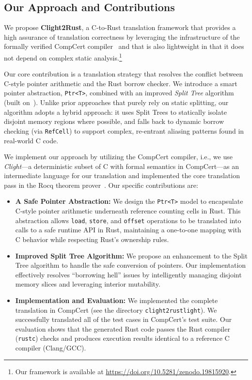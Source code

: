 \documentclass{llncs} %
\begin{document}
\subsection{Our Approach and Contributions}
%
We propose \textbf{Clight2Rust}, a C-to-Rust translation framework that provides
a high assurance of translation correctness by leveraging the infrastructure of the formally verified CompCert compiler~\cite{Leroy2009} and that is also lightweight in that it does not depend on complex static analysis.\footnote{Our framework is available at {\small\url{https://doi.org/10.5281/zenodo.19815920}}.}

Our core contribution is a translation strategy that resolves the conflict between C-style pointer arithmetic and the Rust borrow checker. We introduce a smart pointer abstraction, \texttt{Ptr<T>}, combined with an improved \emph{Split Tree} algorithm (built on~\cite{Fromherz2024}). Unlike prior approaches that purely rely on static splitting, our algorithm adopts a hybrid approach: it uses Split Trees to statically isolate disjoint memory regions where possible, and falls back to dynamic borrow checking (via \texttt{RefCell}) to support complex, re-entrant aliasing patterns found in real-world C code.

We implement our approach by utilizing the CompCert compiler, i.e., we use \emph{Clight}---a deterministic subset of C with formal semantics in CompCert---as an intermediate language for our translation and implemented the core translation pass in the Rocq theorem prover~\cite{rocq}. Our specific contributions are:
\begin{itemize}
    \item \textbf{A Safe Pointer Abstraction:} We design the \texttt{Ptr<T>} model to encapsulate C-style pointer arithmetic underneath reference counting cells in Rust. This abstraction allows \texttt{load}, \texttt{store}, and \texttt{offset} operations to be translated into calls to a safe runtime API in Rust, maintaining a one-to-one mapping with C behavior while respecting Rust's ownership rules.
    \item \textbf{Improved Split Tree Algorithm:} We propose an enhancement to the Split Tree algorithm to handle the safe conversion of pointers. Our implementation effectively resolves ``borrowing hell'' issues by intelligently managing disjoint memory slices and leveraging interior mutability.
    \item \textbf{Implementation and Evaluation:} We implemented the complete translation in CompCert (see the directory \texttt{clight2rustlight}). We successfully translated all of the test cases in CompCert's test suite. Our evaluation shows that the generated Rust code passes the Rust compiler (\texttt{rustc}) checks and produces execution results identical to a reference C compiler (Clang/GCC).
\end{itemize}
\end{document}
